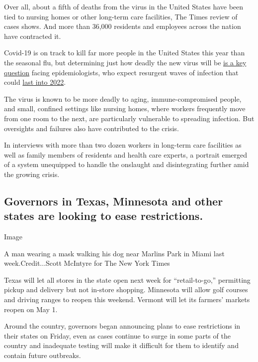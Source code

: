 Over all, about a fifth of deaths from the virus in the United States
have been tied to nursing homes or other long-term care facilities, The
Times review of cases shows. And more than 36,000 residents and
employees across the nation have contracted it.

Covid-19 is on track to kill far more people in the United States this
year than the seasonal flu, but determining just how deadly the new
virus will be
\href{https://www.nytimes3xbfgragh.onion/2020/04/17/us/coronavirus-death-rate.html}{is
a key question} facing epidemiologists, who expect resurgent waves of
infection that could
\href{https://science.sciencemag.org/content/early/2020/04/14/science.abb5793}{last
into 2022}.

The virus is known to be more deadly to aging, immune-compromised
people, and small, confined settings like nursing homes, where workers
frequently move from one room to the next, are particularly vulnerable
to spreading infection. But oversights and failures also have
contributed to the crisis.

In interviews with more than two dozen workers in long-term care
facilities as well as family members of residents and health care
experts, a portrait emerged of a system unequipped to handle the
onslaught and disintegrating further amid the growing crisis.

\hypertarget{governors-in-texas-minnesota-and-other-states-are-looking-to-ease-restrictions}{%
\subsection{Governors in Texas, Minnesota and other states are looking
to ease
restrictions.}\label{governors-in-texas-minnesota-and-other-states-are-looking-to-ease-restrictions}}

Image

A man wearing a mask walking his dog near Marlins Park in Miami last
week.Credit...Scott McIntyre for The New York Times

Texas will let all stores in the state open next week for
``retail-to-go,'' permitting pickup and delivery but not in-store
shopping. Minnesota will allow golf courses and driving ranges to reopen
this weekend. Vermont will let its farmers' markets reopen on May 1.

Around the country, governors began announcing plans to ease
restrictions in their states on Friday, even as cases continue to surge
in some parts of the country and inadequate testing will make it
difficult for them to identify and contain future outbreaks.

